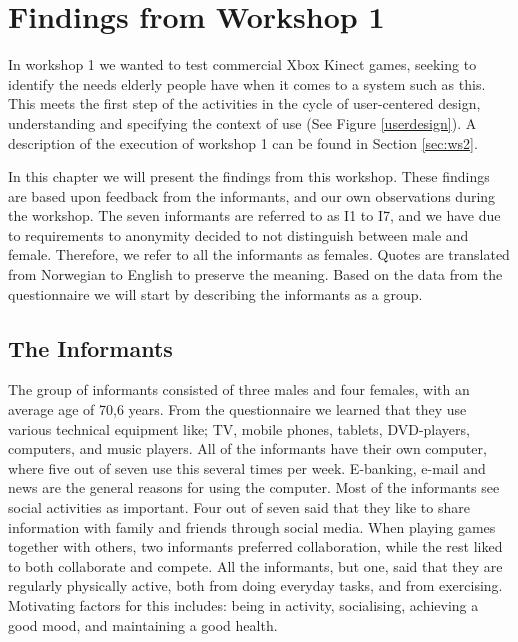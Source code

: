 \chapter{Findings from Workshop 1}
\label{chap:findW1}

In workshop 1 we wanted to test commercial Xbox Kinect games, seeking to identify the needs elderly people have when it comes to a system such as this. This meets the first step of the activities in the cycle of user-centered design, understanding and specifying the context of use (See Figure \ref{userdesign}). A description of the execution of workshop 1 can be found in Section \ref{sec:ws2}. 

In this chapter we will present the findings from this workshop. These findings are based upon feedback from the informants, and our own observations during the workshop. The seven informants are referred to as I1 to I7, and we have due to requirements to anonymity decided to not distinguish between male and female. Therefore, we refer to all the informants as females. Quotes are translated from Norwegian to English to  preserve the meaning. Based on the data from the questionnaire we will start by describing the informants as a group.

\section{The Informants}
The group of informants consisted of three males and four females, with an average age of 70,6 years. From the questionnaire we learned that they use various technical equipment like; TV, mobile phones, tablets, DVD-players, computers, and music players. All of the informants have their own computer, where five out of seven use this several times per week. E-banking, e-mail and news are the general reasons for using the computer. Most of the informants see social activities as important. Four out of seven said that they like to share information with family and friends through social media. When playing games together with others, two informants preferred collaboration, while the rest liked to both collaborate and compete. All the informants, but one, said that they are regularly physically active, both from doing everyday tasks, and from exercising. Motivating factors for this includes: being in activity, socialising, achieving a good mood, and maintaining a good health.

